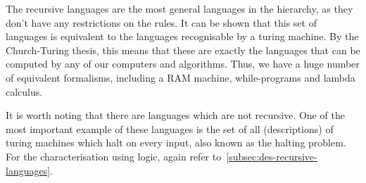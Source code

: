 The recursive languages are the most general languages in the hierarchy, as they don't have any restrictions on the rules.
It can be shown that this set of languages is equivalent to the languages recognisable by a turing machine.
By the Church-Turing thesis, this means that these are exactly the languages that can be computed by any of our computers and algorithms.
Thus, we have a huge number of equivalent formalisms, including a RAM machine, while-programs and lambda calculus.

It is worth noting that there are languages which are not recursive.
One of the most important example of these languages is the set of all (descriptions) of turing machines which halt on every input, also known as the halting problem.
For the characterisation using logic, again refer to~\cref{subsec:des-recursive-languages}.

